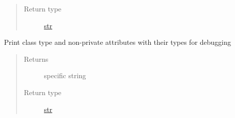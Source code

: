 \documentclass[letterpaper,10pt,english]{sphinxmanual}
\begin{document}
\begin{fulllineitems}
\begin{fulllineitems}
\begin{quote}
\begin{description}
\item[{Return type}] \leavevmode
\href{https://docs.python.org/2.7/library/functions.html\#str}{str}

\end{description}\end{quote}

\end{fulllineitems}


\begin{fulllineitems}
\label{util/api:escape.util.api.AbstractAPI.__str__}
Print class type and non-private attributes with their types for debugging
\begin{quote}\begin{description}
\item[{Returns}] \leavevmode
specific string

\item[{Return type}] \leavevmode
\href{https://docs.python.org/2.7/library/functions.html\#str}{str}

\end{description}\end{quote}

\end{fulllineitems}


\end{fulllineitems}

\end{document}

